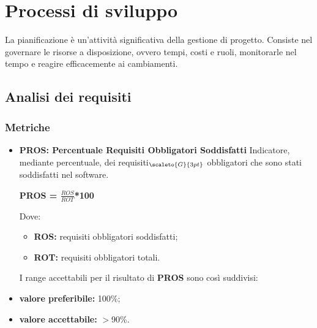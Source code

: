 \section{Processi di sviluppo}\label{QualitaDiProcessoProcessiDiSviluppo}
La pianificazione è un’attività significativa della gestione di progetto.
Consiste nel governare le risorse a disposizione, ovvero tempi, costi e ruoli, monitorarle nel tempo e reagire efficacemente ai cambiamenti.

\subsection{Analisi dei requisiti}\label{QualitaDiProcessoProcessiDiSviluppoAnalisiDeiRequisiti}
\subsubsection{Metriche}\label{MetricheProcessiDiSviluppo}
\begin{itemize}
	\item[] \textbf{PROS: Percentuale Requisiti Obbligatori Soddisfatti}
	Indicatore, mediante percentuale, dei requisiti$_{\scaleto{G}{3pt}}$ obbligatori che sono stati soddisfatti nel software.
	\begin{center}
		\textbf{PROS = $\frac{ROS}{ROT}$*100}
	\end{center}
	Dove:
	\begin{itemize}
		\item \textbf{ROS:} requisiti obbligatori soddisfatti;
		\item \textbf{ROT:} requisiti obbligatori totali.
	\end{itemize}
	I range accettabili per il risultato di \textbf{PROS} sono così suddivisi:
	\item \textbf{valore preferibile:} 100\%;
	\item \textbf{valore accettabile:} $>$90\%.
\end{itemize}

